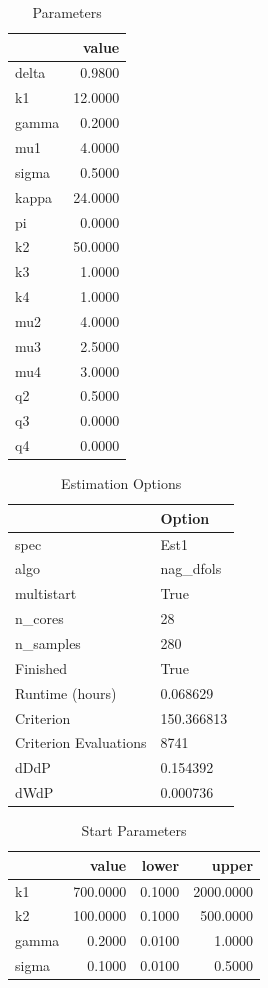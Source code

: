 \documentclass[letter, 10pt]{article}
\begin{document}
\begin{table}[h]
\centering
\caption{Parameters}
\begin{tabular}{lr}
\toprule
 & value \\
\midrule
delta & 0.9800 \\
k1 & 12.0000 \\
gamma & 0.2000 \\
mu1 & 4.0000 \\
sigma & 0.5000 \\
kappa & 24.0000 \\
pi & 0.0000 \\
k2 & 50.0000 \\
k3 & 1.0000 \\
k4 & 1.0000 \\
mu2 & 4.0000 \\
mu3 & 2.5000 \\
mu4 & 3.0000 \\
q2 & 0.5000 \\
q3 & 0.0000 \\
q4 & 0.0000 \\
\bottomrule
\end{tabular}
\end{table}

\begin{table}[h]
\centering
\caption{Estimation Options}
\begin{tabular}{ll}
\toprule
 & Option \\
\midrule
spec & Est1 \\
algo & nag\_dfols \\
multistart & True \\
n\_cores & 28 \\
n\_samples & 280 \\
Finished & True \\
Runtime (hours) & 0.068629 \\
Criterion & 150.366813 \\
Criterion Evaluations & 8741 \\
dDdP & 0.154392 \\
dWdP & 0.000736 \\
\bottomrule
\end{tabular}
\end{table}

\begin{table}[h]
\centering
\caption{Start Parameters}
\begin{tabular}{lrrr}
\toprule
 & value & lower & upper \\
\midrule
k1 & 700.0000 & 0.1000 & 2000.0000 \\
k2 & 100.0000 & 0.1000 & 500.0000 \\
gamma & 0.2000 & 0.0100 & 1.0000 \\
sigma & 0.1000 & 0.0100 & 0.5000 \\
\bottomrule
\end{tabular}
\end{table}
\end{document}
